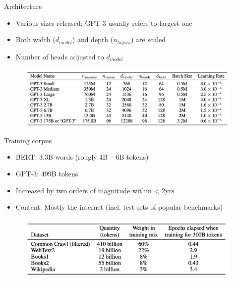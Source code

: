 
\begin{vbframe}{Architecture}

\vfill

\begin{itemize}
	\item Various sizes released; GPT-3 usually refers to largest one
	\item Both width ($d_{model}$) and depth ($n_{layers}$) are scaled
	\item Number of heads adjusted to $d_{model}$
\end{itemize}

	\begin{figure}
		\centering
		\includegraphics[width=11cm]{figure/gptarch.png}\\
	\end{figure}

\vfill

\end{vbframe}


\begin{vbframe}{Training corpus}

\vfill

\begin{itemize}
	\item BERT: 3.3B words (rougly 4B -- 6B tokens)
	\item GPT-3: 499B tokens
	\item Increased by two orders of magnitude within < 2yrs
	\item Content: Mostly the internet (incl. test sets of popular benchmarks)
\end{itemize}

	\begin{figure}
		\centering
		\includegraphics[width=11cm]{figure/traincorp.png}\\
	\end{figure}
\vfill

\end{vbframe}

